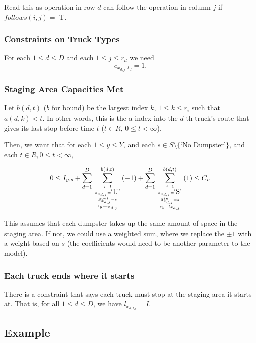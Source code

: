 \documentclass{article}
\begin{document}
Read this as operation in row $d$ can follow the operation in column $j$ if $follows(i,j) = $ T.

\subsubsection{Constraints on Truck Types}

For each $ 1 \le d \le D$ and each $1 \le j \le r_d $
we need $$ c_{x_{d,j},t_{d}} = 1 .$$

\subsubsection{Staging Area Capacities Met}

Let $b(d,t) $ ($b$ for bound) be the largest index $k$, $1 \le k \le r_i$ such that $a(d, k) < t$.
In other words, this is the a index into the $d$-th truck's route that gives its last stop before time $t$ ($t \in R$, $0 \le t < \infty $).

Then, we want that for each $1 \le y \le Y$, and each $s \in S \setminus \{\mbox{`No Dumpster'}\}$, and each $t \in R, 0 \le t < \infty $,

$$0 \le I_{y, s} 
 + \sum_{d=1}^D \sum^{b(d,t)} _{j=1 \atop { o_{x_{d,j}}  = \mbox{`U'} \atop   { S^{out}_{x_{d,j}} = s  \atop  s_y = l_{x_{d,j}}  }      }} (-1)
 + \sum_{d=1}^D \sum^{b(d,t)} _{j=1 \atop { o_{x_{d,j}}  = \mbox{`S'} \atop   { S^{in }_{x_{d,j}} = s  \atop  s_y = l_{x_{d,j}}  }      }} ( 1) \le C_i.$$
 
This assumes that each dumpster takes up the same amount of space in the staging area.
If not, we could use a weighted sum, where we replace the $\pm 1$ with a weight based on $s$
(the coefficients would need to be another parameter to the model).

\subsubsection{Each truck ends where it starts}
There is a constraint that says each truck must stop at the staging area it starts at.
That is, for all $1 \le d \le D$, we have $l_{x_{d, r_d}} = I$.

\subsection{Example}

\end{document}
